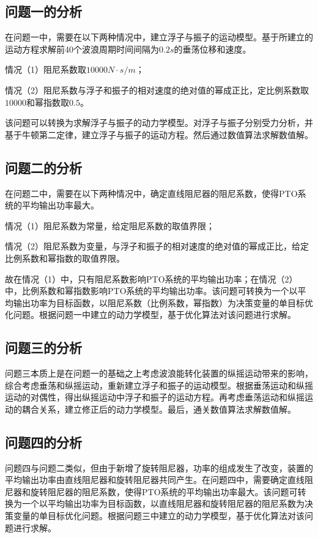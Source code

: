 \documentclass{my_paper}
\begin{document}
\subsection{问题一的分析}

在问题一中，需要在以下两种情况中，建立浮子与振子的运动模型。基于所建立的运动方程求解前40个波浪周期时间间隔为$0.2s$的垂荡位移和速度。

情况（1）阻尼系数取$10000N \cdot s/m$；

情况（2）阻尼系数与浮子和振子的相对速度的绝对值的幂成正比，定比例系数取$10000$和幂指数取$0.5$。

该问题可以转换为求解浮子与振子的动力学模型。对浮子与振子分别受力分析，并基于牛顿第二定律，建立浮子与振子的运动方程。然后通过数值算法求解数值解。

\subsection{问题二的分析}

在问题二中，需要在以下两种情况中，确定直线阻尼器的阻尼系数，使得PTO系统的平均输出功率最大。

情况（1）阻尼系数为常量，给定阻尼系数的取值界限；

情况（2）阻尼系数为变量，与浮子和振子的相对速度的绝对值的幂成正比，给定比例系数和幂指数的取值界限。

故在情况（1）中，只有阻尼系数影响PTO系统的平均输出功率；在情况（2）中，比例系数和幂指数影响PTO系统的平均输出功率。该问题可转换为一个以平均输出功率为目标函数，以阻尼系数（比例系数，幂指数）为决策变量的单目标优化问题。根据问题一中建立的动力学模型，基于优化算法对该问题进行求解。

\subsection{问题三的分析}

问题三本质上是在问题一的基础之上考虑波浪能转化装置的纵摇运动带来的影响，综合考虑垂荡和纵摇运动，重新建立浮子和振子的运动模型。根据垂荡运动和纵摇运动的对偶性，得出纵摇运动中浮子和振子的运动方程。再考虑垂荡运动和纵摇运动的耦合关系，建立修正后的动力学模型。最后，通关数值算法求解数值解。

\subsection{问题四的分析}

问题四与问题二类似，但由于新增了旋转阻尼器，功率的组成发生了改变，装置的平均输出功率由直线阻尼器和旋转阻尼器共同产生。在问题四中，需要确定直线阻尼器和旋转阻尼器的阻尼系数，使得PTO系统的平均输出功率最大。该问题可转换为一个以平均输出功率为目标函数，以直线阻尼器和旋转阻尼器的阻尼系数为决策变量的单目标优化问题。根据问题三中建立的动力学模型，基于优化算法对该问题进行求解。
 
\end{document}

